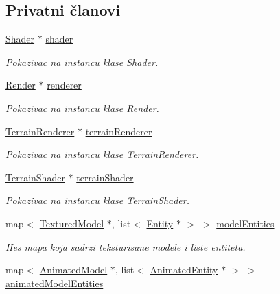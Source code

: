 \subsection*{Privatni članovi}
\begin{DoxyCompactItemize}
\item 
\hyperlink{classshader_1_1Shader}{Shader} $\ast$ \hyperlink{classcore_1_1MainRenderer_a9e5b8ba9a151d64b79612b8631fc1255}{shader}
\begin{DoxyCompactList}\small\item\em Pokazivac na instancu klase Shader. \end{DoxyCompactList}\item 
\hyperlink{classcore_1_1Render}{Render} $\ast$ \hyperlink{classcore_1_1MainRenderer_a3cdbf7f833cac2e18e8bb7d3cdd7728d}{renderer}
\begin{DoxyCompactList}\small\item\em Pokazivac na instancu klase \hyperlink{classcore_1_1Render}{Render}. \end{DoxyCompactList}\item 
\hyperlink{classcore_1_1TerrainRenderer}{Terrain\+Renderer} $\ast$ \hyperlink{classcore_1_1MainRenderer_aba23d91ed6ade9c35600156c0e1f0d83}{terrain\+Renderer}
\begin{DoxyCompactList}\small\item\em Pokazivac na instancu klase \hyperlink{classcore_1_1TerrainRenderer}{Terrain\+Renderer}. \end{DoxyCompactList}\item 
\hyperlink{classshader_1_1TerrainShader}{Terrain\+Shader} $\ast$ \hyperlink{classcore_1_1MainRenderer_a502a7c6f714266f27601913496c396f3}{terrain\+Shader}
\begin{DoxyCompactList}\small\item\em Pokazivac na instancu klase Terrain\+Shader. \end{DoxyCompactList}\item 
map$<$ \hyperlink{classmodel_1_1TexturedModel}{Textured\+Model} $\ast$, list$<$ \hyperlink{classentity_1_1Entity}{Entity} $\ast$ $>$ $>$ \hyperlink{classcore_1_1MainRenderer_ab98c73a5c79cb0017ae5a7f307c9aafe}{model\+Entities}
\begin{DoxyCompactList}\small\item\em Hes mapa koja sadrzi teksturisane modele i liste entiteta. \end{DoxyCompactList}\item 
map$<$ \hyperlink{classmodel_1_1AnimatedModel}{Animated\+Model} $\ast$, list$<$ \hyperlink{classentity_1_1AnimatedEntity}{Animated\+Entity} $\ast$ $>$ $>$ \hyperlink{classcore_1_1MainRenderer_a9ec98b646c857dd05b42a5c1961c3b9d}{animated\+Model\+Entities}

\end{DoxyCompactItemize}
